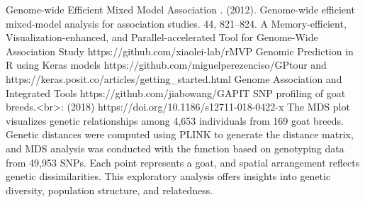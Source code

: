 \markdownRendererUlItem {} Genome-wide Efficient Mixed Model Association .  (2012). Genome-wide efficient mixed-model analysis for association studies.  44, 821–824.\markdownRendererUlItemEnd 
\markdownRendererUlItem {} A Memory-efficient, Visualization-enhanced, and Parallel-accelerated Tool for Genome-Wide Association Study https://github.com/xiaolei-lab/rMVP\markdownRendererUlItemEnd 
\markdownRendererUlItem {} Genomic Prediction in R using Keras models https://github.com/miguelperezenciso/GPtour and https://keras.posit.co/articles/getting_started.html\markdownRendererUlItemEnd 
\markdownRendererUlItem {} Genome Association and Integrated Tools https://github.com/jiabowang/GAPIT\markdownRendererUlItemEnd 
\markdownRendererUlEnd \markdownRendererInterblockSeparator
{}
\markdownRendererSectionEnd \markdownRendererSectionBegin
{}\markdownRendererInterblockSeparator
{}\markdownRendererOlBeginTight
{}SNP profiling of goat breeds.<br>:  (2018) https://doi.org/10.1186/s12711-018-0422-x\markdownRendererOlItemEnd 
\markdownRendererOlEndTight \markdownRendererInterblockSeparator
{}\markdownRendererInterblockSeparator
{}\markdownRendererInterblockSeparator
{}\markdownRendererBlockQuoteBegin
{}\markdownRendererInterblockSeparator
{}The MDS plot visualizes genetic relationships among 4,653 individuals from 169 goat breeds. Genetic distances were computed using PLINK to generate the distance matrix, and MDS analysis was conducted with the  function based on genotyping data from 49,953 SNPs. Each point represents a goat, and spatial arrangement reflects genetic dissimilarities. This exploratory analysis offers insights into genetic diversity, population structure, and relatedness.
